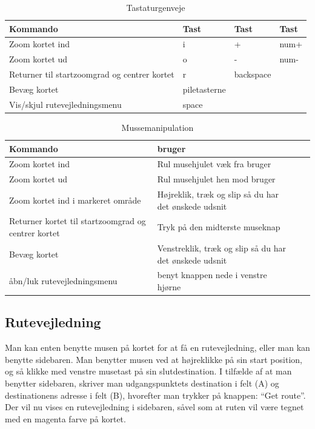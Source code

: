 \begin{table}[h!t]
\centering
	\caption{Tastaturgenveje}
	\begin{tabular}{p{6cm} l l l}
		\hline\hline
		Kommando & Tast & Tast & Tast \\ [0.5ex]
		\hline
		Zoom kortet ind & i & + & num+\\
		Zoom kortet ud & o & - & num-\\
		Returner til startzoomgrad og centrer kortet & r & backspace\\
		Bevæg kortet & piletasterne\\
		Vis/skjul rutevejledningsmenu & space \\
		\hline
	\end{tabular}
\end{table}

\begin{table}[h!t]
\centering
	\caption{Mussemanipulation}
	\begin{tabular}{p{6cm} l l p{4cm}}
		\hline\hline
		Kommando & bruger \\ [0.5ex]
		\hline
		Zoom kortet ind & Rul musehjulet væk fra bruger\\
		Zoom kortet ud & Rul musehjulet hen mod bruger\\
		Zoom kortet ind i markeret område & Højreklik, træk og slip så du har det ønskede udsnit\\
		Returner kortet til startzoomgrad og centrer kortet & Tryk på den midterste museknap\\
		Bevæg kortet & Venstreklik, træk og slip så du har det ønskede udsnit\\
		åbn/luk rutevejledningsmenu & benyt knappen nede i venstre hjørne\\
		\hline
	\end{tabular}
\end{table}

\subsection{Rutevejledning}

Man kan enten benytte musen på kortet for at få en rutevejledning, eller man kan benytte sidebaren. Man benytter musen ved at højreklikke på sin start position, og så klikke med venstre musetast på sin slutdestination. I tilfælde af at man benytter sidebaren, skriver man udgangspunktets destination i felt (A) og destinationens adresse i felt (B), hvorefter man trykker på knappen: ``Get route''. Der vil nu vises en rutevejledning i sidebaren, såvel som at ruten vil være tegnet med en magenta farve på kortet.

